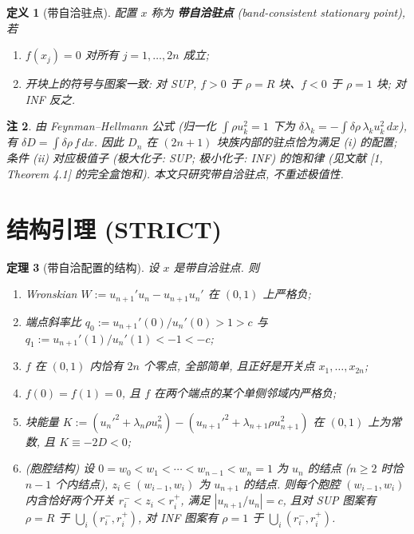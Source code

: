 \documentclass[UTF8]{ctexart}
\newtheorem{theorem}{定理}[section]
\newtheorem{remark}[theorem]{注}
\newtheorem{definition}[theorem]{定义}
\begin{document}
\begin{definition}[带自洽驻点]\label{def:bc}
配置 $x$ 称为 \textbf{带自洽驻点} (band-consistent stationary point), 若
\begin{enumerate}
	\item[(i)] $f(x_j)=0$ 对所有 $j=1,\dots,2n$ 成立;
	\item[(ii)] 开块上的符号与图案一致: 对 SUP, $f>0$ 于 $\rho=R$ 块、$f<0$ 于
	$\rho=1$ 块; 对 INF 反之.
\end{enumerate}
\end{definition}

\begin{remark}\label{rem:fh}
由 Feynman--Hellmann 公式 (归一化 $\int\rho u_k^2=1$ 下为
$\delta\lambda_k=-\int\delta\rho\,\lambda_ku_k^2\,dx$), 有 $\delta D=\int\delta\rho\, f\,dx$.
因此 $D_n$ 在 $(2n+1)$ 块族内部的驻点恰为满足 (i) 的配置; 条件 (ii) 对应极值子
(极大化子: SUP; 极小化子: INF) 的饱和律 (见文献 [1, Theorem 4.1] 的完全盒饱和).
本文只研究带自洽驻点, 不重述极值性.
\end{remark}

\section{结构引理 (STRICT)}\label{sec:structure}

\begin{theorem}[带自洽配置的结构]\label{thm:structure}
设 $x$ 是带自洽驻点. 则
\begin{enumerate}
	\item[(a)] Wronskian $W:=u_{n+1}'u_n-u_{n+1}u_n'$ 在 $(0,1)$ 上严格负;
	\item[(b)] 端点斜率比 $q_0:=u_{n+1}'(0)/u_n'(0)>1>c$ 与
	$q_1:=u_{n+1}'(1)/u_n'(1)<-1<-c$;
	\item[(c)] $f$ 在 $(0,1)$ 内恰有 $2n$ 个零点, 全部简单, 且正好是开关点
	$x_1,\dots,x_{2n}$;
	\item[(d)] $f(0)=f(1)=0$, 且 $f$ 在两个端点的某个单侧邻域内严格负;
	\item[(e)] 块能量 $K:=(u_n'^2+\lambda_n\rho u_n^2)-(u_{n+1}'^2+\lambda_{n+1}\rho u_{n+1}^2)$
	在 $(0,1)$ 上为常数, 且 $K\equiv-2D<0$;
	\item[(f)] (胞腔结构) 设 $0=w_0<w_1<\cdots<w_{n-1}<w_n=1$ 为 $u_n$ 的结点
	($n\ge2$ 时恰 $n-1$ 个内结点), $z_i\in(w_{i-1},w_i)$ 为 $u_{n+1}$ 的结点.
	则每个胞腔 $(w_{i-1},w_i)$ 内含恰好两个开关 $r_i^-<z_i<r_i^+$, 满足
	$|u_{n+1}/u_n|=c$, 且对 SUP 图案有 $\rho=R$ 于 $\bigcup_i(r_i^-,r_i^+)$,
	对 INF 图案有 $\rho=1$ 于 $\bigcup_i(r_i^-,r_i^+)$.
\end{enumerate}
\end{theorem}
\end{document}
